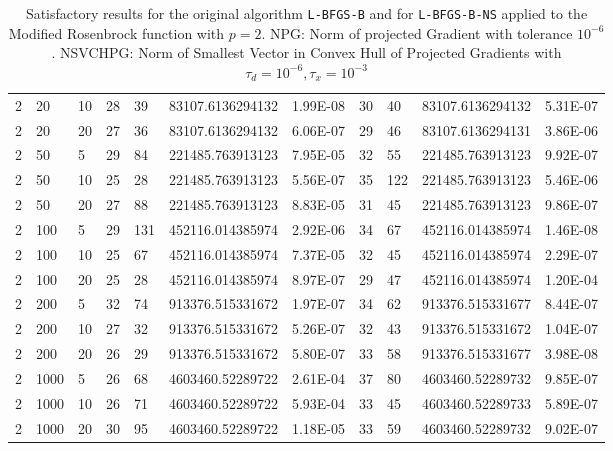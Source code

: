 \begin{center}
\begin{table}
\begin{center}
\begin{tabular}{|l|l|l|l|l|l|l|l|l|l|l|}
      2 &  20 & 10 & 28 & 39 & 83107.6136294132 & 1.99E-08 & 30 & 40 & 83107.6136294132 & 5.31E-07\\
      2 &  20 & 20 & 27 & 36 & 83107.6136294132 & 6.06E-07 & 29 & 46 & 83107.6136294131 & 3.86E-06\\
      2 &  50 & 5 & 29 & 84 & 221485.763913123 & 7.95E-05 & 32 & 55 & 221485.763913123 & 9.92E-07\\
      2 &  50 & 10 & 25 & 28 & 221485.763913123 & 5.56E-07 & 35 & 122 & 221485.763913123 & 5.46E-06\\
      2 &  50 & 20 & 27 & 88 & 221485.763913123 & 8.83E-05 & 31 & 45 & 221485.763913123 & 9.86E-07\\
      2 &  100 & 5 & 29 & 131 & 452116.014385974 & 2.92E-06 & 34 & 67 & 452116.014385974 & 1.46E-08\\
      2 &  100 & 10  & 25 & 67 & 452116.014385974 & 7.37E-05 & 32 & 45 & 452116.014385974 & 2.29E-07\\
      2 &  100 & 20  & 25 & 28 & 452116.014385974 & 8.97E-07 & 29 & 47 & 452116.014385974 & 1.20E-04\\
      2 &  200 & 5 & 32 & 74 & 913376.515331672 & 1.97E-07 & 34 & 62 & 913376.515331677 & 8.44E-07\\
      2 &  200 & 10  & 27 & 32 & 913376.515331672 & 5.26E-07 & 32 & 43 & 913376.515331672 & 1.04E-07\\
      2 &  200 & 20  & 26 & 29 & 913376.515331672 & 5.80E-07 & 33 & 58 & 913376.515331677 & 3.98E-08\\
      2 &  1000 & 5  & 26 & 68 & 4603460.52289722 & 2.61E-04 & 37 & 80 & 4603460.52289732 & 9.85E-07\\
      2 &  1000 & 10  & 26 & 71 & 4603460.52289722 & 5.93E-04 & 33 & 45 & 4603460.52289733 & 5.89E-07\\
      2 &  1000 & 20  & 30 & 95 & 4603460.52289722 & 1.18E-05 & 33 & 59 & 4603460.52289732 & 9.02E-07\\
        \hline
      \end{tabular}
      \caption[Modified Rosenbrock with $p = 2$]{Satisfactory results for the original algorithm \texttt{L-BFGS-B}  and for \texttt{L-BFGS-B-NS} applied to the Modified Rosenbrock function with $p = 2$. NPG: Norm of projected Gradient with tolerance $10^{-6}$. 
NSVCHPG: Norm of Smallest Vector in Convex Hull of Projected Gradients with $\tau_d = 10^{-6}, \tau_x = 10^{-3}$}
      \label{pequal2}
    \end{center}
  \end{table}
\end{center}

